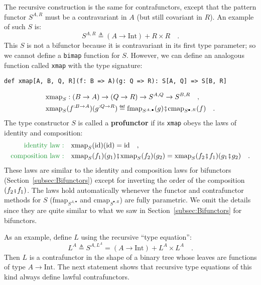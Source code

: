 The recursive construction is the same for contrafunctors, except
that the pattern
functor $S^{A,R}$ must be a contravariant in $A$ (but still covariant
in $R$). An example of such $S$ is:
\begin{equation}
S^{A,R}\triangleq\left(A\rightarrow\text{Int}\right)+R\times R\quad.\label{eq:f-example-contra-bifunctor}
\end{equation}
This $S$ is not a bifunctor because it is contravariant in its first
type parameter; so we cannot define a \lstinline!bimap! function
for $S$. However, we can define an analogous function called \lstinline!xmap!
with the type signature:
\begin{lstlisting}
def xmap[A, B, Q, R](f: B => A)(g: Q => R): S[A, Q] => S[B, R]
\end{lstlisting}
\begin{align*}
 & \text{xmap}_{S}:\left(B\rightarrow A\right)\rightarrow\left(Q\rightarrow R\right)\rightarrow S^{A,Q}\rightarrow S^{B,R}\quad,\\
 & \text{xmap}_{S}(f^{:B\rightarrow A})(g^{:Q\rightarrow R})\triangleq\text{fmap}_{S^{A,\bullet}}(g)\bef\text{cmap}_{S^{\bullet,R}}(f)\quad.
\end{align*}
The type constructor $S$ is called a \textbf{profunctor}
if its \lstinline!xmap! obeys the laws of identity and composition:
\begin{align}
{\color{greenunder}\text{identity law}:}\quad & \text{xmap}_{S}(\text{id})(\text{id})=\text{id}\quad,\label{eq:f-profunctor-identity-law}\\
{\color{greenunder}\text{composition law}:}\quad & \text{xmap}_{S}(f_{1})(g_{1})\bef\text{xmap}_{S}(f_{2})(g_{2})=\text{xmap}_{S}(f_{2}\bef f_{1})(g_{1}\bef g_{2})\quad.\label{eq:f-profunctor-composition-law}
\end{align}
These laws are similar to the identity and composition laws for bifunctors
(Section~\ref{subsec:Bifunctors}) except for inverting the order
of the composition $\left(f_{2}\bef f_{1}\right)$. The laws hold
automatically whenever the functor and contrafunctor methods for $S$
($\text{fmap}_{S^{A,\bullet}}$ and $\text{cmap}_{S^{\bullet,R}}$)
are fully parametric. We omit the details since they are quite similar
to what we saw in Section~\ref{subsec:Bifunctors} for bifunctors.

As an example, define $L$ using the recursive \textsf{``}type equation\textsf{''}:
\[
L^{A}\triangleq S^{A,L^{A}}=\left(A\rightarrow\text{Int}\right)+L^{A}\times L^{A}\quad.
\]
Then $L$ is a contrafunctor in the shape of a binary tree whose leaves
are functions of type $A\rightarrow\text{Int}$. The next statement
shows that recursive type equations of this kind always define lawful
contrafunctors.

